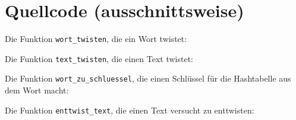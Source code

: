 \documentclass[a4paper,10pt,ngerman]{scrartcl}
\begin{document}
\section{Quellcode (ausschnittsweise)}

Die Funktion \texttt{wort\_twisten}, die ein Wort twistet:
 

\vspace{10pt}
Die Funktion \texttt{text\_twisten}, die einen Text twistet:


\vspace{10pt}
Die Funktion \texttt{wort\_zu\_schluessel}, die einen Schlüssel für die Hashtabelle aus dem Wort macht:


\vspace{10pt}
Die Funktion \texttt{enttwist\_text}, die einen Text versucht zu enttwisten:

\end{document}
